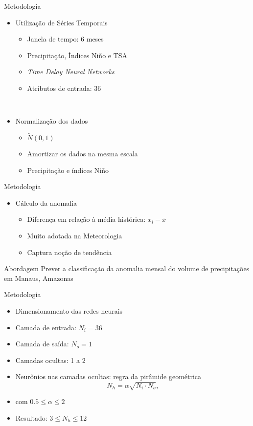 \begin{frame}{Metodologia}
  \begin{itemize}
  	\item Utilização de Séries Temporais
    \begin{itemize}
      \item Janela de tempo: $6$ meses
      \item Precipitação, Índices Niño e TSA
      \item \emph{Time Delay Neural Networks}
      \item Atributos de entrada: 36
    \end{itemize}
  	\ \ \newline
    \item Normalização dos dados
    \begin{itemize}
      \item $\tilde N(0,1)$
      \item Amortizar os dados na mesma escala
      \item Precipitação e índices Niño
    \end{itemize}
  \end{itemize}
\end{frame}

\begin{frame}{Metodologia}
  \begin{itemize}
    \item Cálculo da \alert{anomalia}
    \begin{itemize}
      \item Diferença em relação à média histórica: $x_i - \overline{x}$
      \item Muito adotada na Meteorologia
      \item Captura noção de tendência
    \end{itemize}
  \end{itemize}
  \pause
  \begin{block}{Abordagem}
  Prever a classificação da anomalia mensal do volume de precipitações em Manaus, Amazonas
  \end{block}
\end{frame}

\begin{frame}{Metodologia}
\begin{itemize}
  \item Dimensionamento das redes neurais
  \ \ \newline
  \item Camada de entrada: $N_i = 36$
  \item Camada de saída: $N_o = 1$
  \item Camadas ocultas: 1 a 2
  \item Neurônios nas camadas ocultas: regra da pirâmide geométrica
  \begin{equation}
  N_h = \alpha \sqrt{N_i \cdot N_o},
  \end{equation}
 \item com  $0.5 \leq \alpha \leq 2$
 \ \ \newline
 \item \alert{Resultado}: $3 \leq N_h \leq 12$
 \end{itemize}
\end{frame}


